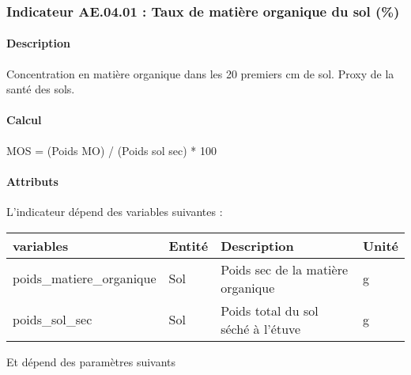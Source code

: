 \documentclass[
]{article}
\newenvironment{Shaded}{\begin{snugshade}}{\end{snugshade}}
\newcommand{\NormalTok}[1]{#1}
\begin{document}
\subsubsection{Indicateur AE.04.01 : Taux de matière organique du sol
(\%)}\label{indicateur-ae.04.01-taux-de-matiuxe8re-organique-du-sol}

\paragraph{Description}\label{description-11}

Concentration en matière organique dans les 20 premiers cm de sol. Proxy
de la santé des sols.

\paragraph{Calcul}\label{calcul-11}

\begin{Shaded}
\begin{Highlighting}[]
\NormalTok{MOS = (Poids MO) / (Poids sol sec) * 100}
\end{Highlighting}
\end{Shaded}

\paragraph{Attributs}\label{attributs-29}

L'indicateur dépend des variables suivantes :

\begin{longtable}[]{@{}llll@{}}
\toprule\noalign{}
\textbf{variables} & \textbf{Entité} & \textbf{Description} &
\textbf{Unité} \\
\midrule\noalign{}
\endhead
\bottomrule\noalign{}
\endlastfoot
poids\_matiere\_organique & Sol & Poids sec de la matière organique &
g \\
poids\_sol\_sec & Sol & Poids total du sol séché à l'étuve & g \\
\end{longtable}

Et dépend des paramètres suivants
\end{document}
